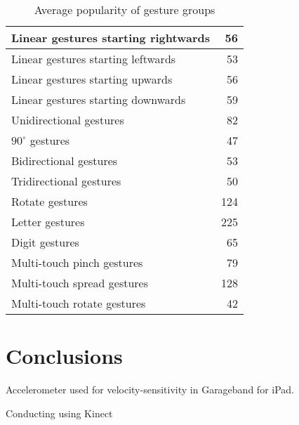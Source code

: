 \documentclass{aes130}
\begin{document}
\begin{table} \label{tab:Survey1AverageGroups}
\begin{center}
\begin{tabular}{|l|r|} \hline

Linear gestures starting rightwards &  56 \\ \hline
Linear gestures starting leftwards  &  53 \\ \hline
Linear gestures starting upwards    &  56 \\ \hline
Linear gestures starting downwards  &  59 \\ \hline \hline

Unidirectional gestures             &  82 \\ \hline
$90^\circ$ gestures                 &  47 \\ \hline
Bidirectional gestures              &  53 \\ \hline
Tridirectional gestures             &  50 \\ \hline \hline

Rotate gestures                     & 124 \\ \hline \hline

Letter gestures                     & 225 \\ \hline
Digit gestures                      &  65 \\ \hline \hline

Multi-touch pinch gestures          &  79 \\ \hline
Multi-touch spread gestures         & 128 \\ \hline
Multi-touch rotate gestures         &  42 \\ \hline

\end{tabular}
\end{center}
\caption{Average popularity of gesture groups}
\end{table}








\section{Conclusions} \label{sec:Conclusions}



Accelerometer used for velocity-sensitivity in Garageband for iPad\cite{GaragebandIpadDemo}.

Conducting using Kinect\cite{KinectConductingGameIdea}



\end{document}
